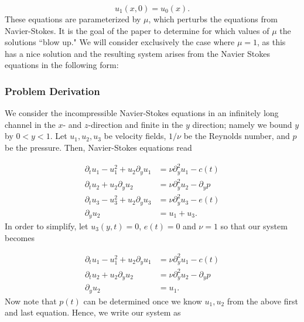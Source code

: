 \documentclass{CUP-JNL-DTM}%
\theoremstyle{definition}
\numberwithin{equation}{section}
\begin{document}
\begin{equation}
    u_1(x,0) = u_0(x).  
\end{equation}
These equations are parameterized by $\mu$, which perturbs the equations from Navier-Stokes. It is the goal of the paper to determine for which values of $\mu$ the solutions ``blow up." We will consider exclusively the case where $\mu = 1$, as this has a nice solution and the resulting system arises from the Navier Stokes equations in the following form:

\subsubsection{Problem Derivation}

We consider the incompressible Navier-Stokes equations in an infinitely long channel in the $x$- and $z$-direction and finite in the $y$ direction; namely we bound $y$ by $0 < y < 1$. Let $u_1, u_2, u_3$ be velocity fields, $1/\nu$ be the Reynolds number, and $p$ be the pressure. Then, Navier-Stokes equations read

\begin{equation}
    \begin{split}
        \partial_t u_1 - u_1^2 + u_2\partial_yu_1 & = \nu \partial_y^2 u_1 - c(t) \\
        \partial_t u_2 + u_2 \partial_y u_2 & = \nu \partial_y^2 u_2 - \partial_y p \\
        \partial_t u_3 - u_3^2 + u_2\partial_y u_3 & = \nu \partial_y^2 u_3 - e(t) \\
        \partial_y u_2 & = u_1 + u_3. 
    \end{split}
\end{equation}
In order to simplify, let $u_3(y,t) = 0$, $e(t) = 0$ and $\nu = 1$ so that our system becomes 

\begin{equation}
    \begin{split}
        \partial_t u_1 - u_1^2 + u_2\partial_yu_1 & = \nu \partial_y^2 u_1 - c(t) \\
        \partial_t u_2 + u_2 \partial_y u_2 & = \nu \partial_y^2 u_2 - \partial_y p \\
        \partial_y u_2 & = u_1. 
    \end{split}
\end{equation}
Now note that $p(t)$ can be determined once we know $u_1, u_2$ from the above first and last equation. Hence, we write our system as 
\end{document}
